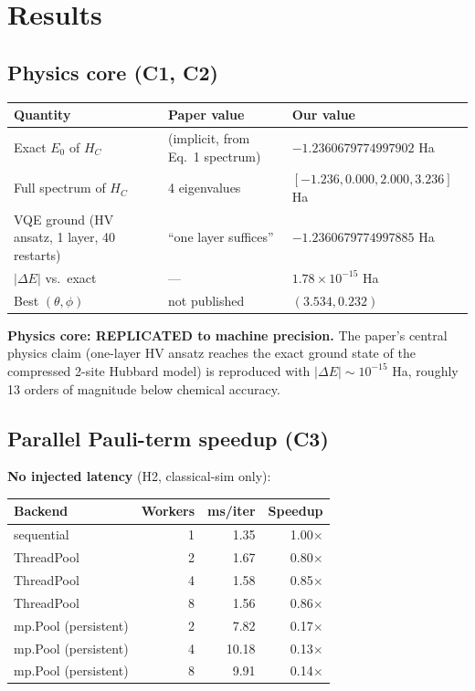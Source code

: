 \documentclass[11pt]{article}
\begin{document}
\section{Results}

\subsection{Physics core (C1, C2)}

\begin{tabular}{@{}lll@{}}
\toprule
Quantity & Paper value & Our value \\
\midrule
Exact $E_0$ of $H_C$ & (implicit, from Eq.~1 spectrum) & $-1.2360679774997902$ Ha \\
Full spectrum of $H_C$ & 4 eigenvalues & $[-1.236, 0.000, 2.000, 3.236]$ Ha \\
VQE ground (HV ansatz, 1 layer, 40 restarts) & ``one layer suffices'' & $-1.2360679774997885$ Ha \\
$|\Delta E|$ vs.\ exact & --- & $1.78 \times 10^{-15}$ Ha \\
Best $(\theta, \phi)$ & not published & $(3.534, 0.232)$ \\
\bottomrule
\end{tabular}

\textbf{Physics core: REPLICATED to machine precision.} The paper's central physics claim (one-layer HV ansatz reaches the exact ground state of the compressed 2-site Hubbard model) is reproduced with $|\Delta E| \sim 10^{-15}$ Ha, roughly 13 orders of magnitude below chemical accuracy.

\subsection{Parallel Pauli-term speedup (C3)}

\textbf{No injected latency} (H2, classical-sim only):

\begin{tabular}{@{}lrrr@{}}
\toprule
Backend & Workers & ms/iter & Speedup \\
\midrule
sequential & 1 & 1.35 & 1.00$\times$ \\
ThreadPool & 2 & 1.67 & 0.80$\times$ \\
ThreadPool & 4 & 1.58 & 0.85$\times$ \\
ThreadPool & 8 & 1.56 & 0.86$\times$ \\
mp.Pool (persistent) & 2 & 7.82 & 0.17$\times$ \\
mp.Pool (persistent) & 4 & 10.18 & 0.13$\times$ \\
mp.Pool (persistent) & 8 & 9.91 & 0.14$\times$ \\
\bottomrule
\end{tabular}
\end{document}
